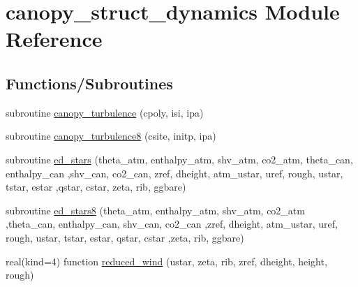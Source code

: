 \hypertarget{namespacecanopy__struct__dynamics}{}\section{canopy\+\_\+struct\+\_\+dynamics Module Reference}
\label{namespacecanopy__struct__dynamics}
\subsection*{Functions/\+Subroutines}
\begin{DoxyCompactItemize}
\item 
subroutine \hyperlink{namespacecanopy__struct__dynamics_ac7eef4d24c3e07ccb461d418e32d466e}{canopy\+\_\+turbulence} (cpoly, isi, ipa)
\item 
subroutine \hyperlink{namespacecanopy__struct__dynamics_ab65e289b4069536fa3342bc3034db824}{canopy\+\_\+turbulence8} (csite, initp, ipa)
\item 
subroutine \hyperlink{namespacecanopy__struct__dynamics_aecb5209e48d8e43c4c1b214d31d3f7e2}{ed\+\_\+stars} (theta\+\_\+atm, enthalpy\+\_\+atm, shv\+\_\+atm, co2\+\_\+atm, theta\+\_\+can, enthalpy\+\_\+can                                                                                                           ,shv\+\_\+can, co2\+\_\+can, zref, dheight, atm\+\_\+ustar, uref, rough, ustar, tstar, estar                                                                                   ,qstar, cstar, zeta, rib, ggbare)
\item 
subroutine \hyperlink{namespacecanopy__struct__dynamics_a3a475e27ec763919f874021a412cf343}{ed\+\_\+stars8} (theta\+\_\+atm, enthalpy\+\_\+atm, shv\+\_\+atm, co2\+\_\+atm                                                                                                                                                                                                       ,theta\+\_\+can, enthalpy\+\_\+can, shv\+\_\+can, co2\+\_\+can                                                                                                                                                                                                       ,zref, dheight, atm\+\_\+ustar, uref, rough, ustar, tstar, estar, qstar, cstar                                                                                                   ,zeta, rib, ggbare)
\item 
real(kind=4) function \hyperlink{namespacecanopy__struct__dynamics_ae5504447c798d15053109bc4f8ff9346}{reduced\+\_\+wind} (ustar, zeta, rib, zref, dheight, height, rough)

\end{DoxyCompactItemize}
